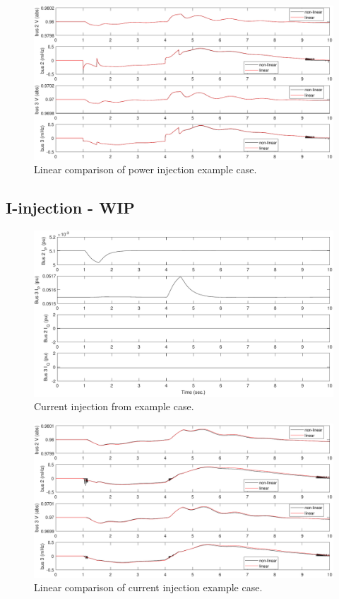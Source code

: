 \begin{figure}[H]
	\centering
	\footnotesize
	\includegraphics[width=.85\linewidth]{examples/pwrmod/pwr-p-linComp}
	\caption{Linear comparison of power injection example case.}
	\label{fig: pwr p linComp}
\end{figure}%

\pagebreak
\subsection{I-injection - WIP}
\begin{figure}[H]
	\centering
	\footnotesize
	\includegraphics[width=.85\linewidth]{examples/pwrmod/pwr-i-pert}
	\caption{Current injection from example case.}
	\label{fig: pwr i pert}
\end{figure}%

\begin{figure}[H]
	\centering
	\footnotesize
	\includegraphics[width=.85\linewidth]{examples/pwrmod/pwr-i-linComp}
	\caption{Linear comparison of current injection example case.}
	\label{fig: pwr i linComp}
\end{figure}%